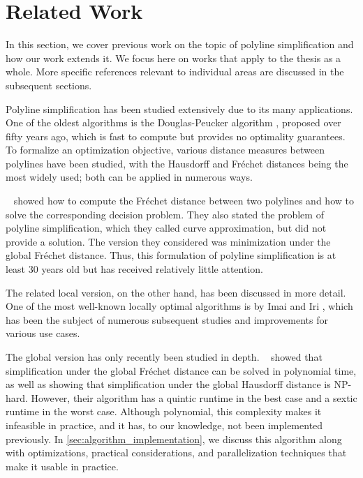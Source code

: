 \section{Related Work}
\label{sec:related_work}

In this section, we cover previous work on the topic of polyline simplification and how our work extends it. We focus here on works that apply to the thesis as a whole. More specific references relevant to individual areas are discussed in the subsequent sections.

Polyline simplification has been studied extensively due to its many applications. One of the oldest algorithms is the Douglas-Peucker algorithm \cite{algorithms_reduction_number_points_caricature}, proposed over fifty years ago, which is fast to compute but provides no optimality guarantees. To formalize an optimization objective, various distance measures between polylines have been studied, with the Hausdorff and Fréchet distances being the most widely used; both can be applied in numerous ways.

\citeauthor{computing_the_frechet_distance_between_two_polygonal_curves}~\cite{computing_the_frechet_distance_between_two_polygonal_curves} showed how to compute the Fréchet distance between two polylines and how to solve the corresponding decision problem. They also stated the problem of polyline simplification, which they called curve approximation, but did not provide a solution. The version they considered was minimization under the global Fréchet distance. Thus, this formulation of polyline simplification is at least 30 years old but has received relatively little attention.

The related local version, on the other hand, has been discussed in more detail. One of the most well-known locally optimal algorithms is by Imai and Iri \cite{computational_geometric_methods_for_polygonal_approximations_of_a_curve}, which has been the subject of numerous subsequent studies and improvements for various use cases.

The global version has only recently been studied in depth. \citeauthor{on_optimal_polyline_simplification_using_the_hausdorff_and_frechet_distance}~\cite{on_optimal_polyline_simplification_using_the_hausdorff_and_frechet_distance} showed that simplification under the global Fréchet distance can be solved in polynomial time, as well as showing that simplification under the global Hausdorff distance is NP-hard. However, their algorithm has a quintic runtime in the best case and a sextic runtime in the worst case. Although polynomial, this complexity makes it infeasible in practice, and it has, to our knowledge, not been implemented previously. In \cref{sec:algorithm_implementation}, we discuss this algorithm along with optimizations, practical considerations, and parallelization techniques that make it usable in practice.


